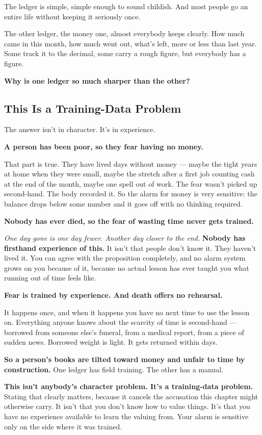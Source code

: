 \documentclass[11pt,a4paper]{article}
\begin{document}
The ledger is simple, simple enough to sound childish. And most people go an entire life without keeping it seriously once.

The other ledger, the money one, almost everybody keeps clearly. How much came in this month, how much went out, what's left, more or less than last year. Some track it to the decimal, some carry a rough figure, but everybody has a figure.

\textbf{Why is one ledger so much sharper than the other?}

\subsection{This Is a Training-Data Problem}

The answer isn't in character. It's in experience.

\textbf{A person has been poor, so they fear having no money.}

That part is true. They have lived days without money --- maybe the tight years at home when they were small, maybe the stretch after a first job counting cash at the end of the month, maybe one spell out of work. The fear wasn't picked up second-hand. The body recorded it. So the alarm for money is very sensitive: the balance drops below some number and it goes off with no thinking required.

\textbf{Nobody has ever died, so the fear of wasting time never gets trained.}

\textit{One day gone is one day fewer.} \textit{Another day closer to the end.} \textbf{Nobody has firsthand experience of this.} It isn't that people don't know it. They haven't lived it. You can agree with the proposition completely, and no alarm system grows on you because of it, because no actual lesson has ever taught you what running out of time feels like.

\textbf{Fear is trained by experience. And death offers no rehearsal.}

It happens once, and when it happens you have no next time to use the lesson on. Everything anyone knows about the scarcity of time is second-hand --- borrowed from someone else's funeral, from a medical report, from a piece of sudden news. Borrowed weight is light. It gets returned within days.

\textbf{So a person's books are tilted toward money and unfair to time by construction.} One ledger has field training. The other has a manual.

\textbf{This isn't anybody's character problem. It's a training-data problem.} Stating that clearly matters, because it cancels the accusation this chapter might otherwise carry. It isn't that you don't know how to value things. It's that you have no experience available to learn the valuing from. Your alarm is sensitive only on the side where it was trained.
\end{document}

